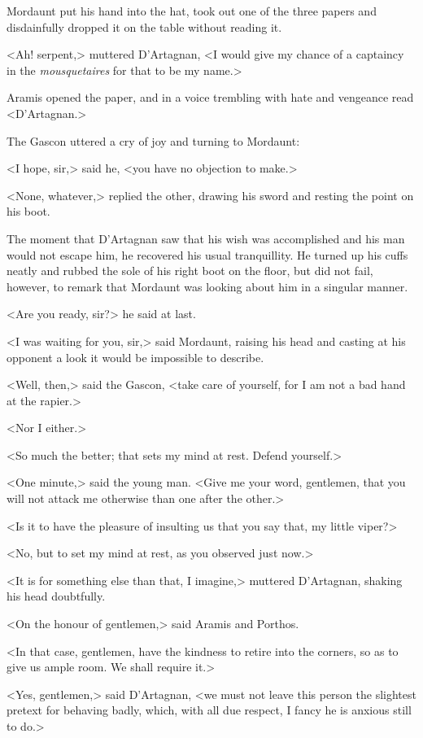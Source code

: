 Mordaunt put his hand into the hat, took out one of the three papers and disdainfully dropped it on the table without reading it.

<Ah! serpent,> muttered D'Artagnan, <I would give my chance of a captaincy in the \textit{mousquetaires} for that to be my name.>

Aramis opened the paper, and in a voice trembling with hate and vengeance read <D'Artagnan.>

The Gascon uttered a cry of joy and turning to Mordaunt:

<I hope, sir,> said he, <you have no objection to make.>

<None, whatever,> replied the other, drawing his sword and resting the point on his boot.

The moment that D'Artagnan saw that his wish was accomplished and his man would not escape him, he recovered his usual tranquillity. He turned up his cuffs neatly and rubbed the sole of his right boot on the floor, but did not fail, however, to remark that Mordaunt was looking about him in a singular manner.

<Are you ready, sir?> he said at last.

<I was waiting for you, sir,> said Mordaunt, raising his head and casting at his opponent a look it would be impossible to describe.

<Well, then,> said the Gascon, <take care of yourself, for I am not a bad hand at the rapier.>

<Nor I either.>

<So much the better; that sets my mind at rest. Defend yourself.>

<One minute,> said the young man. <Give me your word, gentlemen, that you will not attack me otherwise than one after the other.>

<Is it to have the pleasure of insulting us that you say that, my little viper?>

<No, but to set my mind at rest, as you observed just now.>

<It is for something else than that, I imagine,> muttered D'Artagnan, shaking his head doubtfully.

<On the honour of gentlemen,> said Aramis and Porthos.

<In that case, gentlemen, have the kindness to retire into the corners, so as to give us ample room. We shall require it.>

<Yes, gentlemen,> said D'Artagnan, <we must not leave this person the slightest pretext for behaving badly, which, with all due respect, I fancy he is anxious still to do.>

